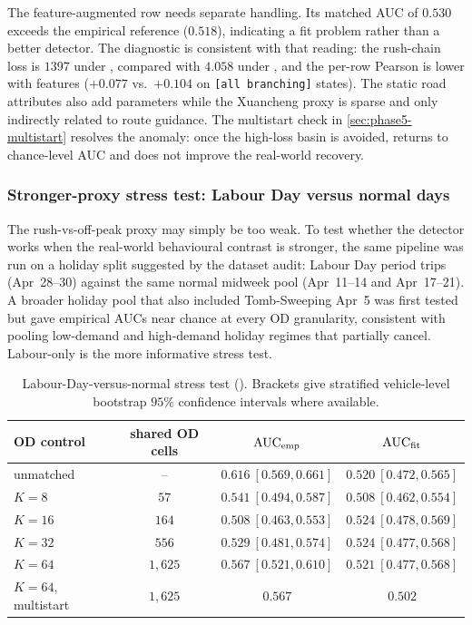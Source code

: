 The feature-augmented row needs separate handling. Its matched
 AUC of $0.530$ exceeds the empirical reference
($0.518$), indicating a fit problem rather than a better detector.
The diagnostic is consistent with that reading: the rush-chain loss is
$1397$ under , compared with $4.058$ under
, and the per-row Pearson is lower with features
($+0.077$ vs.\ $+0.104$ on \texttt{[all branching]} states). The static
road attributes also add parameters while the Xuancheng proxy is sparse
and only indirectly related to route guidance. The multistart check in
\cref{sec:phase5-multistart} resolves the anomaly:
once the high-loss basin is avoided,  returns to
chance-level AUC and does not improve the real-world recovery.

\subsubsection{Stronger-proxy stress test: Labour Day versus normal days}
\label{sec:phase5-labour}

The rush-vs-off-peak proxy may simply be too weak. To test whether the
detector works when the real-world behavioural contrast is stronger, the
same pipeline was run on a holiday split suggested by the dataset audit:
Labour Day period trips (Apr~28--30) against the same normal midweek pool
(Apr~11--14 and Apr~17--21). A broader holiday pool that also included
Tomb-Sweeping Apr~5 was first tested but gave empirical AUCs near chance
at every OD granularity, consistent with pooling low-demand and
high-demand holiday regimes that partially cancel. Labour-only is the
more informative stress test.

\begin{table}[!htbp]
\centering
\caption{Labour-Day-versus-normal stress test
(). Brackets give stratified vehicle-level bootstrap
$95\%$ confidence intervals where available.}
\label{tab:phase5-labour}
\small
\begin{tabular}{lccc}
\toprule
OD control & shared OD cells & $\mathrm{AUC}_{\mathrm{emp}}$ & $\mathrm{AUC}_{\mathrm{fit}}$ \\
\midrule
unmatched & -- & $0.616\ [0.569,0.661]$ & $0.520\ [0.472,0.565]$ \\
$K=8$  & $57$    & $0.541\ [0.494,0.587]$ & $0.508\ [0.462,0.554]$ \\
$K=16$ & $164$   & $0.508\ [0.463,0.553]$ & $0.524\ [0.478,0.569]$ \\
$K=32$ & $556$   & $0.529\ [0.481,0.574]$ & $0.524\ [0.477,0.568]$ \\
$K=64$ & $1{,}625$ & $\mathbf{0.567}\ [0.521,0.610]$ &
$0.521\ [0.477,0.568]$ \\
$K=64$, multistart & $1{,}625$ & $0.567$ & $\mathbf{0.502}$ \\
\bottomrule
\end{tabular}
\end{table}

